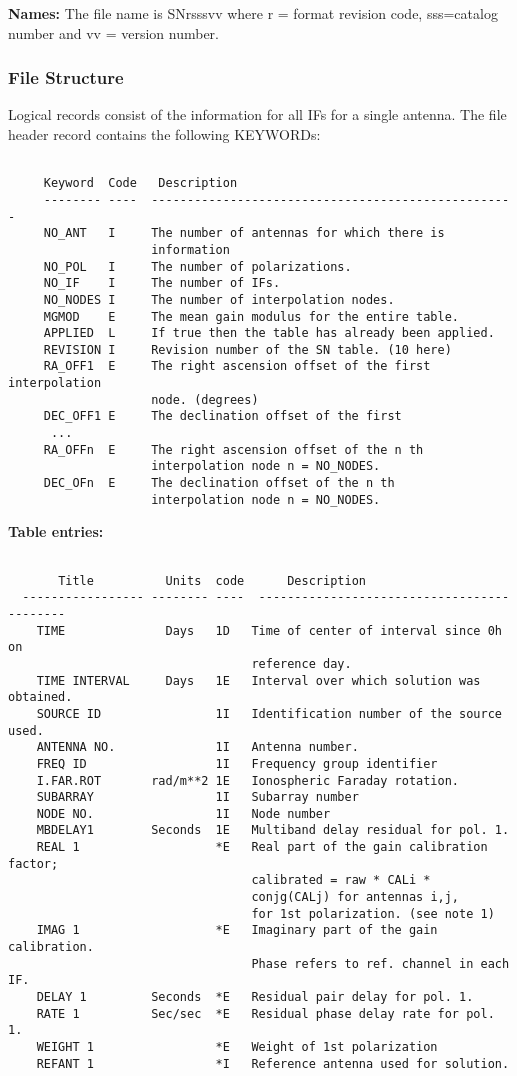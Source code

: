 {\bf Names:} The file name is SNrsssvv where r = format revision code,
sss=catalog number and vv = version number.

\subsubsection{File Structure}

     Logical records consist of the information for all IFs
for a single antenna.  The file header record contains the following
KEYWORDs:
\begin{verbatim}

     Keyword  Code   Description
     -------- ----  ---------------------------------------------------
     NO_ANT   I     The number of antennas for which there is
                    information
     NO_POL   I     The number of polarizations.
     NO_IF    I     The number of IFs.
     NO_NODES I     The number of interpolation nodes.
     MGMOD    E     The mean gain modulus for the entire table.
     APPLIED  L     If true then the table has already been applied.
     REVISION I     Revision number of the SN table. (10 here)
     RA_OFF1  E     The right ascension offset of the first interpolation
                    node. (degrees)
     DEC_OFF1 E     The declination offset of the first
      ...
     RA_OFFn  E     The right ascension offset of the n th
                    interpolation node n = NO_NODES.
     DEC_OFn  E     The declination offset of the n th
                    interpolation node n = NO_NODES.
\end{verbatim}
{\bf Table entries:}
\begin{verbatim}

       Title          Units  code      Description
  ----------------- -------- ----  -------------------------------------------
    TIME              Days   1D   Time of center of interval since 0h on
                                  reference day.
    TIME INTERVAL     Days   1E   Interval over which solution was obtained.
    SOURCE ID                1I   Identification number of the source used.
    ANTENNA NO.              1I   Antenna number.
    FREQ ID                  1I   Frequency group identifier
    I.FAR.ROT       rad/m**2 1E   Ionospheric Faraday rotation.
    SUBARRAY                 1I   Subarray number
    NODE NO.                 1I   Node number
    MBDELAY1        Seconds  1E   Multiband delay residual for pol. 1.
    REAL 1                   *E   Real part of the gain calibration factor;
                                  calibrated = raw * CALi *
                                  conjg(CALj) for antennas i,j,
                                  for 1st polarization. (see note 1)
    IMAG 1                   *E   Imaginary part of the gain calibration.
                                  Phase refers to ref. channel in each IF.
    DELAY 1         Seconds  *E   Residual pair delay for pol. 1.
    RATE 1          Sec/sec  *E   Residual phase delay rate for pol. 1.
    WEIGHT 1                 *E   Weight of 1st polarization
    REFANT 1                 *I   Reference antenna used for solution.

\end{verbatim}
